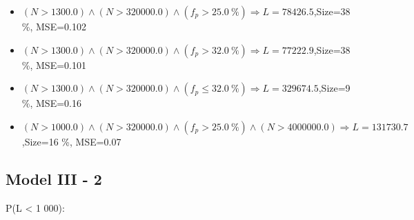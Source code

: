 \documentclass[numbered]{CSL}
\begin{document}
\begin{itemize}
\item $(N > 1300.0) \land (N > 320000.0) \land (f_p > 25.0~\%) \Rightarrow L = 78426.5$,\hfill Size=38 \%, MSE=0.102
\item $(N > 1300.0) \land (N > 320000.0) \land (f_p > 32.0~\%) \Rightarrow L = 77222.9$,\hfill Size=38 \%, MSE=0.101
\item $(N > 1300.0) \land (N > 320000.0) \land (f_p \leq 32.0~\%) \Rightarrow L = 329674.5$,\hfill Size=9 \%, MSE=0.16
\item $(N > 1000.0) \land (N > 320000.0) \land (f_p > 25.0~\%) \land (N > 4000000.0) \Rightarrow L = 131730.7$,\hfill Size=16 \%, MSE=0.07
\end{itemize}

\subsection{Model III - 2}
P(L < 1 000):
\end{document}
